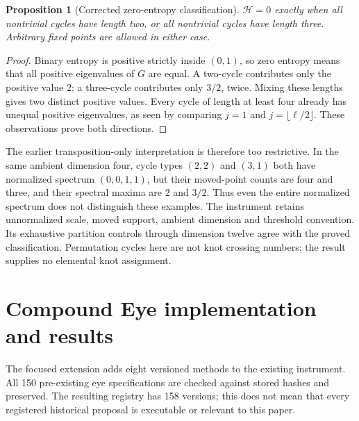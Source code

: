 \documentclass[11pt]{article}
\newtheorem{proposition}{Proposition}
\begin{document}
\begin{proposition}[Corrected zero-entropy classification]
$\mathcal H=0$ exactly when all nontrivial cycles have length two, or all nontrivial cycles have length three. Arbitrary fixed points are allowed in either case.
\end{proposition}
\begin{proof}
Binary entropy is positive strictly inside $(0,1)$, so zero entropy means that all positive eigenvalues of $G$ are equal. A two-cycle contributes only the positive value $2$; a three-cycle contributes only $3/2$, twice. Mixing these lengths gives two distinct positive values. Every cycle of length at least four already has unequal positive eigenvalues, as seen by comparing $j=1$ and $j=\lfloor\ell/2\rfloor$. These observations prove both directions.
\end{proof}

The earlier transposition-only interpretation is therefore too restrictive. In the same ambient dimension four, cycle types $(2,2)$ and $(3,1)$ both have normalized spectrum $(0,0,1,1)$, but their moved-point counts are four and three, and their spectral maxima are $2$ and $3/2$. Thus even the entire normalized spectrum does not distinguish these examples. The instrument retains unnormalized scale, moved support, ambient dimension and threshold convention. Its exhaustive partition controls through dimension twelve agree with the proved classification. Permutation cycles here are not knot crossing numbers; the result supplies no elemental knot assignment.

\section{Compound Eye implementation and results}
The focused extension adds eight versioned methods to the existing instrument. All 150 pre-existing eye specifications are checked against stored hashes and preserved. The resulting registry has 158 versions; this does not mean that every registered historical proposal is executable or relevant to this paper.
\end{document}
